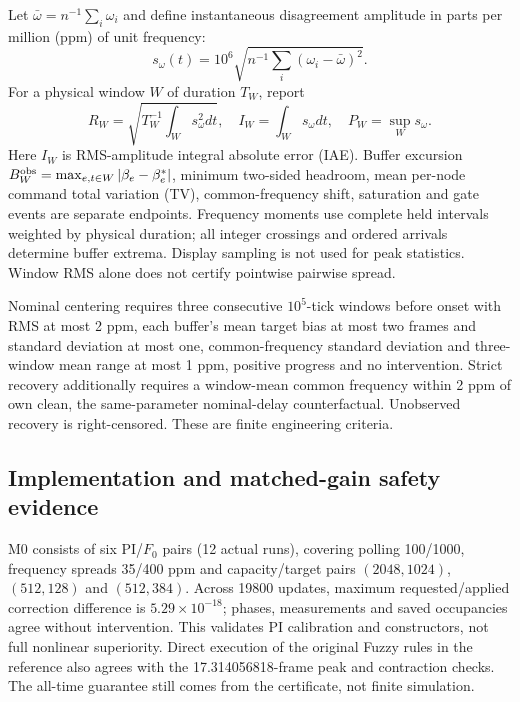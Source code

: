 Let $\bar\omega=n^{-1}\sum_i\omega_i$ and define instantaneous
disagreement amplitude in parts per million (ppm) of unit frequency:
\begin{equation}
 s_\omega(t)=10^6\sqrt{n^{-1}\sum_i(\omega_i-\bar\omega)^2}.
\end{equation}
For a physical window $W$ of duration $T_W$, report
\begin{equation}
 R_W=\sqrt{T_W^{-1}\int_Ws_\omega^2dt},\quad
 I_W=\int_Ws_\omega dt,\quad P_W=\sup_Ws_\omega.
 \label{eq:eval_frequency_metrics}
\end{equation}
Here $I_W$ is RMS-amplitude integral absolute error (IAE).
Buffer excursion $B_W^{\rm obs}=\max_{e,t\in W}|\beta_e-\beta_e^*|$,
minimum two-sided headroom, mean per-node command total variation
(TV), common-frequency shift, saturation and gate events are separate
endpoints. Frequency moments use complete held intervals weighted by
physical duration; all integer crossings and ordered arrivals determine
buffer extrema. Display sampling is not used for peak statistics.
Window RMS alone does not certify pointwise pairwise spread.

Nominal centering requires three consecutive $10^5$-tick windows
before onset with RMS at most 2 ppm, each buffer's mean target bias
at most two frames and standard deviation at most one, common-frequency
standard deviation and three-window mean range at most 1 ppm,
positive progress and no intervention. Strict recovery additionally
requires a window-mean common frequency within 2 ppm of own clean,
the same-parameter nominal-delay counterfactual. Unobserved recovery
is right-censored. These are finite engineering criteria.

\subsection{Implementation and matched-gain safety evidence}
\label{subsec:eval_implementation_reference}
M0 consists of six PI/$F_0$ pairs (12 actual runs), covering polling
100/1000, frequency spreads 35/400 ppm and capacity/target pairs
$(2048,1024)$, $(512,128)$ and $(512,384)$. Across 19800 updates,
maximum requested/applied correction difference is
$5.29\times10^{-18}$; phases, measurements and saved occupancies
agree without intervention. This validates PI calibration and
constructors, not full nonlinear superiority. Direct execution of
the original Fuzzy rules in the reference also agrees with the
17.314056818-frame peak and contraction checks. The all-time
guarantee still comes from the certificate, not finite simulation.

